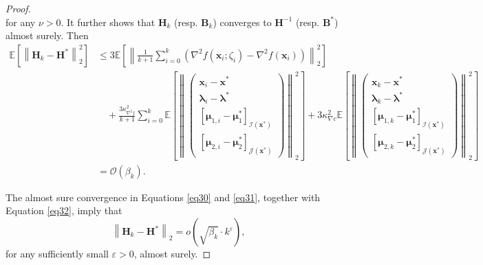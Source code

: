 \documentclass[aos]{imsart}
\numberwithin{equation}{section}
\theoremstyle{plain}
\begin{document}
\begin{appendix}
\begin{proof}
\begin{equation}
    \end{equation}
    for any $\nu > 0$.
    It further shows that $\bm{H}_k$ (resp. $\bm{B}_k$) converges to $\bm{H}^{-1}$ (resp. $\bm{B}^{*}$) almost surely.
    Then
    \begin{equation*}
        \begin{split}
            \mathbb{E} \left[  \left\| \bm{H}_k - \bm{H}^{*}\right\|_2^2 \right] & \leq 3 \mathbb{E} \left[  \left\| \frac{1}{k +1} \sum_{i=0}^{k} \left( \nabla^2 f(\bm{x}_i;\zeta_i) - \nabla^2 f(\bm{x}_i )\right) \right\|_2^2 \right] \\
            & \hspace{1em} + \frac{3\kappa_{\nabla^2 f}^2}{k +1} \sum_{i=0}^{k} \mathbb{E} \left[ \left\|  \left( \begin{array}{c}
    \bm{x}_{i} - \bm{x}^{*}  \\
    \bm{\lambda}_{i} - \bm{\lambda}^{*} \\
    \left[ \bm{\mu}_{1,i} - \bm{\mu}_{1}^{*}\right]_{\mathcal{I}(\bm{x}^{*})} \\
    \left[ \bm{\mu}_{2,i} - \bm{\mu}_{2}^{*} \right]_{\mathcal{J}(\bm{x}^{*})} 
    \end{array} \right)  \right\|_2^2 \right]  + 3 \kappa_{\nabla c}^2 \mathbb{E} \left[\left\|  \left( \begin{array}{c}
    \bm{x}_{k} - \bm{x}^{*}  \\
    \bm{\lambda}_{k} - \bm{\lambda}^{*} \\
    \left[ \bm{\mu}_{1,k} - \bm{\mu}_{1}^{*}\right]_{\mathcal{I}(\bm{x}^{*})} \\
    \left[ \bm{\mu}_{2,k} - \bm{\mu}_{2}^{*} \right]_{\mathcal{J}(\bm{x}^{*})} 
    \end{array} \right)  \right\|_2^2   \right] \\
    & = \mathcal{O}\left( \beta_k \right).
        \end{split}
    \end{equation*}

    The almost sure convergence in Equations \eqref{eq30} and \eqref{eq31}, together with Equation \eqref{eq32}, imply that 
    \begin{equation*}
         \left\| \bm{H}_k - \bm{H}^{*}\right\|_2 = o\left(\sqrt{\beta_k} \cdot k^{\varepsilon}  \right),
    \end{equation*}
    for any sufficiently small $\varepsilon > 0$, almost surely.
\end{proof}



\end{appendix}
\end{document}
